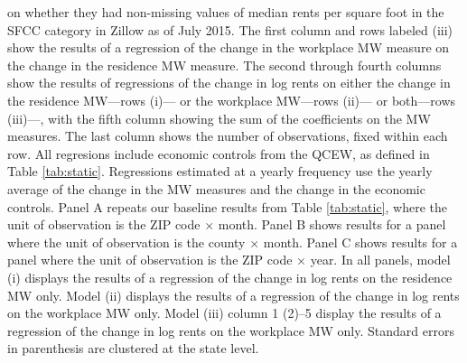 \begin{landscape}
\begin{table}[ht!]
\begin{minipage}{.95\linewidth}
        on whether they had non-missing values of median rents per square foot 
        in the SFCC category in Zillow as of July 2015.
        The first column and rows labeled (iii) show the results of a regression 
        of the change in the workplace MW measure on the change in the 
        residence MW measure.
        The second through fourth columns show the results of regressions of the 
        change in log rents on either the change in the residence MW---rows (i)---
        or the workplace MW---rows (ii)--- 
        or both---rows (iii)---, with the fifth column showing the sum of the 
        coefficients on the MW measures.
        The last column shows the number of observations, fixed within each row.
        All regresions include economic controls from the QCEW, as defined in
        Table \ref{tab:static}.
        Regressions estimated at a yearly frequency use the yearly average of
        the change in the MW measures and the change in the economic controls.
        Panel A repeats our baseline results from Table \ref{tab:static}, where 
        the unit of observation is the ZIP code $\times$ month.
        Panel B shows results for a panel where the unit of observation is the 
        county $\times$ month.
        Panel C shows results for a panel where the unit of observation is the 
        ZIP code $\times$ year.
        In all panels,
        model (i) displays the results of a regression of the change in log 
        rents on the residence MW only.
        Model (ii) displays the results of a regression of the change in log 
        rents on the workplace MW only.
        Model (iii) column 1 (2)--5 display the results of a regression of the 
        change in log rents on the workplace MW only.
        Standard errors in parenthesis are clustered at the state level.        
    \end{minipage}
\end{table}
\end{landscape}
